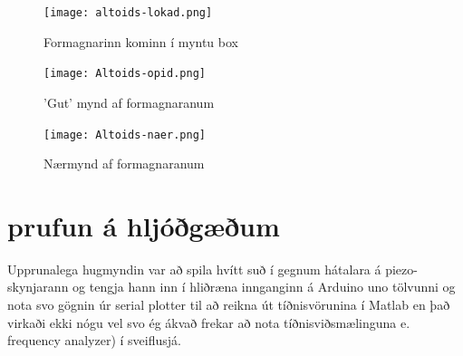 \documentclass{article}
\begin{document}
 \begin{figure}[H]
  	\centering
  	\texttt{[image: altoids-lokad.png]}
  	\caption{Formagnarinn kominn í myntu box}
 	 \label{altoids-lokad}
\end{figure}

 \begin{figure}[H]
  	\centering
  	\texttt{[image: Altoids-opid.png]}
  	\caption{'Gut' mynd af formagnaranum}
 	 \label{altoids-opid}
\end{figure}

 \begin{figure}[H]
  	\centering
  	\texttt{[image: Altoids-naer.png]}
  	\caption{Nærmynd af formagnaranum}
 	 \label{altoids-naer}
\end{figure}

\newpage

\section{prufun á hljóðgæðum}

\begin{flushleft}
Upprunalega hugmyndin var að spila hvítt suð í gegnum hátalara á piezo-skynjarann og tengja hann inn í hliðræna innganginn á Arduino uno tölvunni og nota svo gögnin úr serial plotter til að reikna út tíðnisvörunina í Matlab en það virkaði ekki nógu vel svo ég ákvað frekar að nota tíðnisviðsmælinguna e. frequency analyzer) í sveiflusjá.
\end{flushleft}



\end{document}
